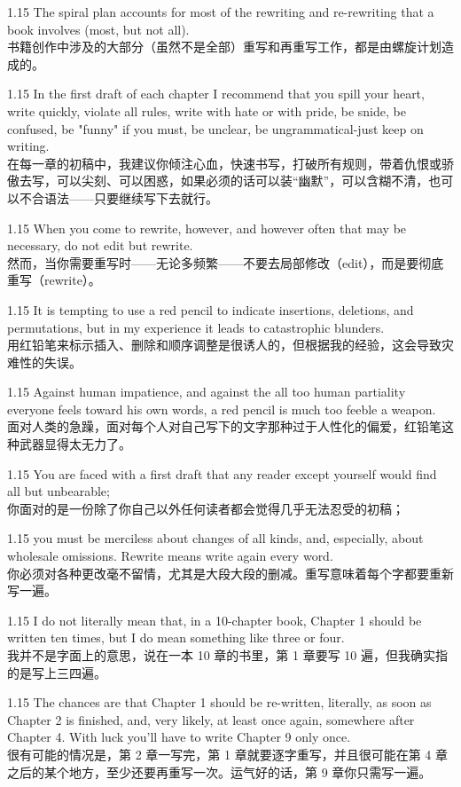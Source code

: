 \documentclass[12pt,a4paper]{article}
\newcommand{\bilingual}[2]{
    \begin{spacing}{1.15} %
        \noindent \normalsize #1 \\[-0.5ex] %
        \small \textcolor{blue!70!black}{#2} %
    \end{spacing}
    \vspace{0.8em} %
}
\begin{document}
\bilingual{The spiral plan accounts for most of the rewriting and re-rewriting that a book involves (most, but not all).}
{书籍创作中涉及的大部分（虽然不是全部）重写和再重写工作，都是由螺旋计划造成的。} %

\bilingual{In the first draft of each chapter I recommend that you spill your heart, write quickly, violate all rules, write with hate or with pride, be snide, be confused, be "funny" if you must, be unclear, be ungrammatical-just keep on writing.}
{在每一章的初稿中，我建议你倾注心血，快速书写，打破所有规则，带着仇恨或骄傲去写，可以尖刻、可以困惑，如果必须的话可以装“幽默”，可以含糊不清，也可以不合语法——只要继续写下去就行。} %

\bilingual{When you come to rewrite, however, and however often that may be necessary, do not edit but rewrite.}
{然而，当你需要重写时——无论多频繁——不要去局部修改（edit），而是要彻底重写（rewrite）。} %

\bilingual{It is tempting to use a red pencil to indicate insertions, deletions, and permutations, but in my experience it leads to catastrophic blunders.}
{用红铅笔来标示插入、删除和顺序调整是很诱人的，但根据我的经验，这会导致灾难性的失误。} %

\bilingual{Against human impatience, and against the all too human partiality everyone feels toward his own words, a red pencil is much too feeble a weapon.}
{面对人类的急躁，面对每个人对自己写下的文字那种过于人性化的偏爱，红铅笔这种武器显得太无力了。} %

\bilingual{You are faced with a first draft that any reader except yourself would find all but unbearable;}
{你面对的是一份除了你自己以外任何读者都会觉得几乎无法忍受的初稿；} %

\bilingual{you must be merciless about changes of all kinds, and, especially, about wholesale omissions. Rewrite means write again every word.}
{你必须对各种更改毫不留情，尤其是大段大段的删减。重写意味着每个字都要重新写一遍。} %

\bilingual{I do not literally mean that, in a 10-chapter book, Chapter 1 should be written ten times, but I do mean something like three or four.}
{我并不是字面上的意思，说在一本 10 章的书里，第 1 章要写 10 遍，但我确实指的是写上三四遍。} %

\bilingual{The chances are that Chapter 1 should be re-written, literally, as soon as Chapter 2 is finished, and, very likely, at least once again, somewhere after Chapter 4. With luck you'll have to write Chapter 9 only once.}
{很有可能的情况是，第 2 章一写完，第 1 章就要逐字重写，并且很可能在第 4 章之后的某个地方，至少还要再重写一次。运气好的话，第 9 章你只需写一遍。} %
\end{document}
